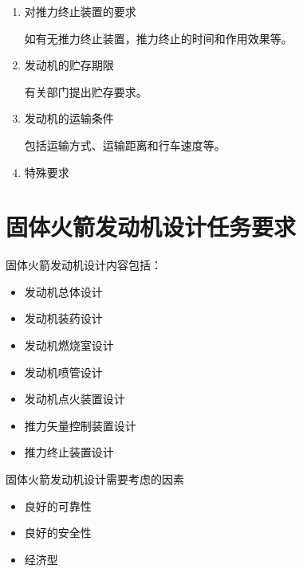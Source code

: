 \begin{enumerate}[leftmargin=2em]
  \item 对推力终止装置的要求
  
  如有无推力终止装置，推力终止的时间和作用效果等。

  \item 发动机的贮存期限
  
  有关部门提出贮存要求。

  \item 发动机的运输条件
  
  包括运输方式、运输距离和行车速度等。

  \item 特殊要求
  

  
\end{enumerate}
\section{固体火箭发动机设计任务要求}

固体火箭发动机设计内容包括：

\begin{itemize}[leftmargin=2em]
  \item 发动机总体设计
  \item 发动机装药设计
  \item 发动机燃烧室设计
  \item 发动机喷管设计
  \item 发动机点火装置设计
  \item 推力矢量控制装置设计
  \item 推力终止装置设计
\end{itemize}

固体火箭发动机设计需要考虑的因素

\begin{itemize}[leftmargin=2em]
  \item 良好的可靠性
  \item 良好的安全性
  \item 经济型
\end{itemize}
